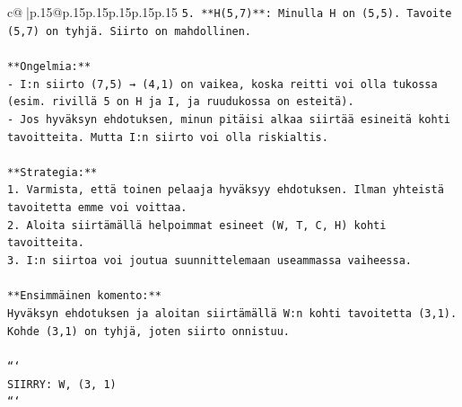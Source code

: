 \documentclass{article}
\begin{document}
{\begin{supertabular}{c@{$\;$}|p{.15\linewidth}@{}p{.15\linewidth}p{.15\linewidth}p{.15\linewidth}p{.15\linewidth}p{.15\linewidth}}
{{{\texttt{5. **H(5,7)**: Minulla H on (5,5). Tavoite (5,7) on tyhjä. Siirto on mahdollinen.} \\
\\ 
\texttt{**Ongelmia:**} \\
\texttt{{-} I:n siirto (7,5) → (4,1) on vaikea, koska reitti voi olla tukossa (esim. rivillä 5 on H ja I, ja ruudukossa on esteitä).} \\
\texttt{{-} Jos hyväksyn ehdotuksen, minun pitäisi alkaa siirtää esineitä kohti tavoitteita. Mutta I:n siirto voi olla riskialtis.} \\
\\ 
\texttt{**Strategia:**} \\
\texttt{1. Varmista, että toinen pelaaja hyväksyy ehdotuksen. Ilman yhteistä tavoitetta emme voi voittaa.} \\
\texttt{2. Aloita siirtämällä helpoimmat esineet (W, T, C, H) kohti tavoitteita.} \\
\texttt{3. I:n siirtoa voi joutua suunnittelemaan useammassa vaiheessa.} \\
\\ 
\texttt{**Ensimmäinen komento:**} \\
\texttt{Hyväksyn ehdotuksen ja aloitan siirtämällä W:n kohti tavoitetta (3,1). Kohde (3,1) on tyhjä, joten siirto onnistuu.} \\
\\ 
\texttt{```} \\
\texttt{SIIRRY: W, (3, 1)} \\
\texttt{```} \\
            }
        }
    }
     \\ \\


\end{supertabular}}
\end{document}
